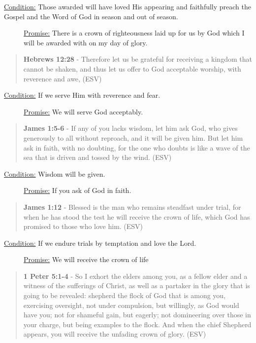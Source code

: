 \documentclass[11pt]{article}
\begin{document}
\begin{description}
\item[{\uline{Condition:} Those awarded will have loved His appearing and faithfully preach the Gospel and the Word of God in season and out of season.}] \uline{Promise:} There is a crown of righteousness laid up for us by God which I will be awarded with on my day of glory.
\end{description}

\begin{quote}
\textbf{Hebrews 12:28} - Therefore let us be grateful for receiving a kingdom that cannot be shaken, and thus let us offer to God acceptable worship, with reverence and awe, (ESV)
\end{quote}

\begin{description}
\item[{\uline{Condition:} If we serve Him with reverence and fear.}] \uline{Promise:} We will serve God acceptably.
\end{description}

\begin{quote}
\textbf{James 1:5-6} - If any of you lacks wisdom, let him ask God, who gives generously to all without reproach, and it will be given him. But let him ask in faith, with no doubting, for the one who doubts is like a wave of the sea that is driven and tossed by the wind. (ESV)
\end{quote}

\begin{description}
\item[{\uline{Condition:} Wisdom will be given.}] \uline{Promise:} If you ask of God in faith.
\end{description}

\begin{quote}
\textbf{James 1:12} - Blessed is the man who remains steadfast under trial, for when he has stood the test he will receive the crown of life, which God has promised to those who love him. (ESV)
\end{quote}

\begin{description}
\item[{\uline{Condition:} If we endure trials by temptation and love the Lord.}] \uline{Promise:} We will receive the crown of life
\end{description}

\begin{quote}
\textbf{1 Peter 5:1-4} - So I exhort the elders among you, as a fellow elder and a witness of the sufferings of Christ, as well as a partaker in the glory that is going to be revealed: shepherd the flock of God that is among you, exercising oversight, not under compulsion, but willingly, as God would have you; not for shameful gain, but eagerly; not domineering over those in your charge, but being examples to the flock. And when the chief Shepherd appears, you will receive the unfading crown of glory. (ESV)
\end{quote}
\end{document}
